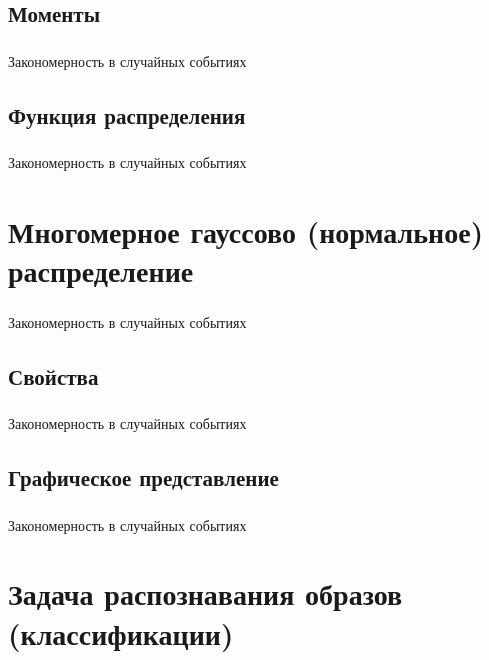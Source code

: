 \documentclass{beamer}
\begin{document}
\subsection{Моменты}

\begin{frame}
  \frametitle{\insertsection}
  \framesubtitle{\insertsubsection}
  Закономерность в случайных событиях
\end{frame}

\subsection{Функция распределения}

\begin{frame}
  \frametitle{\insertsection}
  \framesubtitle{\insertsubsection}
  Закономерность в случайных событиях
\end{frame}

\section{Многомерное гауссово (нормальное) распределение}

\begin{frame}
  \frametitle{\insertsection}
  \framesubtitle{\insertsubsection}
  Закономерность в случайных событиях
\end{frame}

\subsection{Свойства}

\begin{frame}
  \frametitle{\insertsection}
  \framesubtitle{\insertsubsection}
  Закономерность в случайных событиях
\end{frame}

\subsection{Графическое представление}

\begin{frame}
  \frametitle{\insertsection}
  \framesubtitle{\insertsubsection}
  Закономерность в случайных событиях
\end{frame}

\section{Задача распознавания образов (классификации)}
\end{document}
